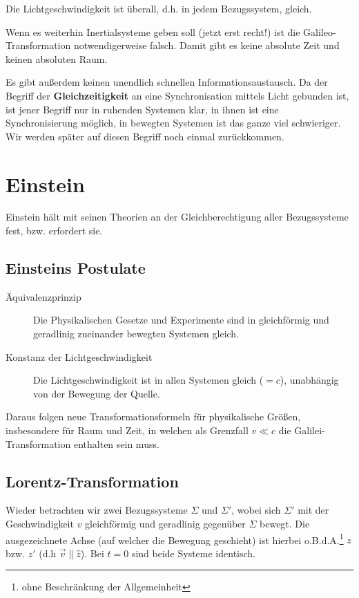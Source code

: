 \begin{folgerung*}
	Die Lichtgeschwindigkeit ist überall, d.h. in jedem Bezugssystem, gleich.
\end{folgerung*}
\begin{folgerung*}
	Wenn es weiterhin Inertialsysteme geben soll (jetzt erst recht!) ist die Galileo-Transformation notwendigerweise falsch. Damit gibt es keine absolute Zeit und keinen absoluten Raum.
\end{folgerung*}
\begin{folgerung*}
	Es gibt außerdem keinen unendlich schnellen Informationsaustausch. Da der Begriff der \textbf{Gleichzeitigkeit} an eine Synchronisation mittels Licht gebunden ist, ist jener Begriff nur in ruhenden Systemen klar, in ihnen ist eine Synchronisierung möglich, in bewegten Systemen ist das ganze viel schwieriger. Wir werden später auf diesen Begriff noch einmal zurückkommen.
\end{folgerung*}

\section{Einstein}
Einstein hält mit seinen Theorien an der Gleichberechtigung aller Bezugssysteme fest, bzw. erfordert sie.

\subsection{Einsteins Postulate}
\begin{description}
	\item[Äquivalenzprinzip] Die Physikalischen Gesetze und Experimente sind in gleichförmig und geradlinig zueinander bewegten Systemen gleich.
	\item[Konstanz der Lichtgeschwindigkeit] Die Lichtgeschwindigkeit ist in allen Systemen gleich ($=c$), unabhängig von der Bewegung der Quelle. 
\end{description}
Daraus folgen neue Transformationsformeln für physikalische Größen, insbesondere für Raum und Zeit, in welchen als Grenzfall $v \ll c$ die Galilei-Transformation enthalten sein muss.

\subsection{Lorentz-Transformation}
Wieder betrachten wir zwei Bezugssysteme $\Sigma$ und $\Sigma'$, wobei sich $\Sigma'$ mit der Geschwindigkeit $v$ gleichförmig und geradlinig gegenüber $\Sigma$ bewegt. Die ausgezeichnete Achse (auf welcher die Bewegung geschieht) ist hierbei o.B.d.A.\footnote{ohne Beschränkung der Allgemeinheit} $z$ bzw. $z'$ (d.h $\vec{v} \parallel \hat{z}$). Bei $t = 0$ sind beide Systeme identisch.

